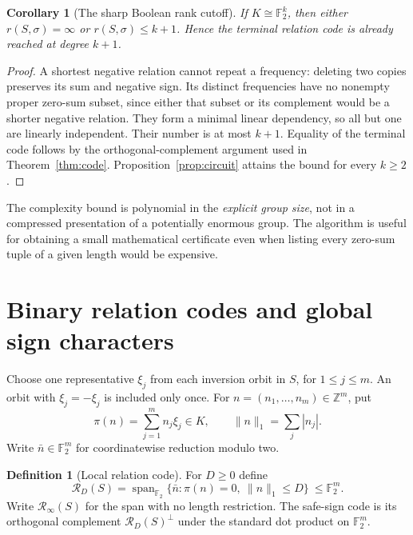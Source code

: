 \documentclass[11pt]{article}
\numberwithin{equation}{section}
\newtheorem{corollary}[theorem]{Corollary}
\theoremstyle{definition}
\newtheorem{definition}[theorem]{Definition}
\theoremstyle{remark}
\newcommand{\F}{\mathbb F}
\newcommand{\Z}{\mathbb Z}
\newcommand{\Span}{\operatorname{span}}
\newcommand{\Rel}{\mathcal R}
\begin{document}
\begin{corollary}[The sharp Boolean rank cutoff]
\label{cor:boolean-cutoff}
If $K\cong\F_2^k$, then either $r(S,\sigma)=\infty$ or
$r(S,\sigma)\leq k+1$. Hence the terminal relation code is already
reached at degree $k+1$.
\end{corollary}
\begin{proof}
A shortest negative relation cannot repeat a frequency: deleting two
copies preserves its sum and negative sign. Its distinct frequencies
have no nonempty proper zero-sum subset, since either that subset or
its complement would be a shorter negative relation. They form a
minimal linear dependency, so all but one are linearly independent.
Their number is at most $k+1$. Equality of the terminal code follows
by the orthogonal-complement argument used in Theorem~\ref{thm:code}.
Proposition~\ref{prop:circuit} attains the bound for every $k\geq2$.
\end{proof}

The complexity bound is polynomial in the \emph{explicit group size},
not in a compressed presentation of a potentially enormous group. The
algorithm is useful for obtaining a small mathematical certificate even
when listing every zero-sum tuple of a given length would be expensive.

\section{Binary relation codes and global sign characters}
\label{sec:codes}

Choose one representative $\xi_j$ from each inversion orbit in $S$,
for $1\leq j\leq m$. An orbit with $\xi_j=-\xi_j$ is included only once.
For $n=(n_1,\ldots,n_m)\in\Z^m$, put
\[
 \pi(n)=\sum_{j=1}^m n_j\xi_j\in K,
 \qquad \|n\|_1=\sum_j|n_j|.
\]
Write $\bar n\in\F_2^m$ for coordinatewise reduction modulo two.

\begin{definition}[Local relation code]
For $D\geq0$ define
\begin{equation}
 \Rel_D(S)=\Span_{\F_2}
   \{\bar n:\pi(n)=0,\ \|n\|_1\leq D\}
   \ \leq\F_2^m.
 \label{eq:relation-code}
\end{equation}
Write $\Rel_\infty(S)$ for the span with no length restriction.
The safe-sign code is its orthogonal complement
$\Rel_D(S)^\perp$ under the standard dot product on $\F_2^m$.
\end{definition}
\end{document}
